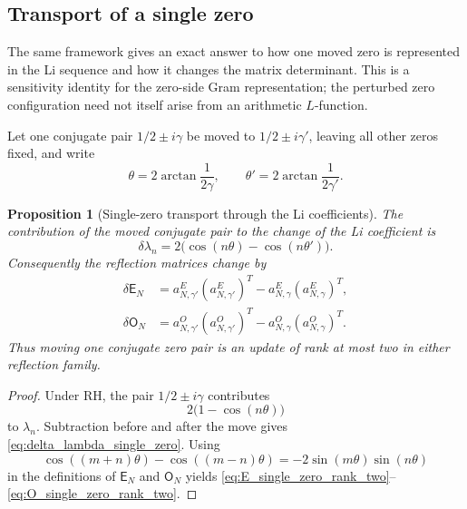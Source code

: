 \documentclass[11pt]{amsart}
\numberwithin{equation}{section}
\theoremstyle{plain}
\newtheorem{proposition}[theorem]{Proposition}
\theoremstyle{definition}
\theoremstyle{remark}
\newcommand{\RH}{\mathrm{RH}}
\newcommand{\E}{\mathsf E}
\newcommand{\Omat}{\mathsf O}
\begin{document}
\subsection{Transport of a single zero}

The same framework gives an exact answer to how one moved zero is represented in the Li sequence and how it changes the matrix determinant.  This is a sensitivity identity for the zero-side Gram representation; the perturbed zero configuration need not itself arise from an arithmetic $L$-function.

Let one conjugate pair $1/2\pm i\gamma$ be moved to $1/2\pm i\gamma'$, leaving all other zeros fixed, and write
\begin{equation}
\theta=2\arctan\frac{1}{2\gamma},
\qquad
\theta'=2\arctan\frac{1}{2\gamma'}.
\label{eq:theta_transport}
\end{equation}

\begin{proposition}[Single-zero transport through the Li coefficients]
\label{prop:single_zero_transport_Li}
The contribution of the moved conjugate pair to the change of the Li coefficient is
\begin{equation}
\boxed{
\delta\lambda_n
=2\bigl(\cos(n\theta)-\cos(n\theta')\bigr).}
\label{eq:delta_lambda_single_zero}
\end{equation}
Consequently the reflection matrices change by
\begin{align}
\delta\E_N
&=a_{N,\gamma'}^E(a_{N,\gamma'}^E)^T
-a_{N,\gamma}^E(a_{N,\gamma}^E)^T,
\label{eq:E_single_zero_rank_two}\\
\delta\Omat_N
&=a_{N,\gamma'}^O(a_{N,\gamma'}^O)^T
-a_{N,\gamma}^O(a_{N,\gamma}^O)^T.
\label{eq:O_single_zero_rank_two}
\end{align}
Thus moving one conjugate zero pair is an update of rank at most two in either reflection family.
\end{proposition}

\begin{proof}
Under $\RH$, the pair $1/2\pm i\gamma$ contributes
\begin{equation}
2\bigl(1-\cos(n\theta)\bigr)
\end{equation}
to $\lambda_n$.  Subtraction before and after the move gives \eqref{eq:delta_lambda_single_zero}.  Using
\begin{equation}
\cos((m+n)\theta)-\cos((m-n)\theta)
=-2\sin(m\theta)\sin(n\theta)
\end{equation}
in the definitions of $\E_N$ and $\Omat_N$ yields \eqref{eq:E_single_zero_rank_two}--\eqref{eq:O_single_zero_rank_two}.
\end{proof}
\end{document}
